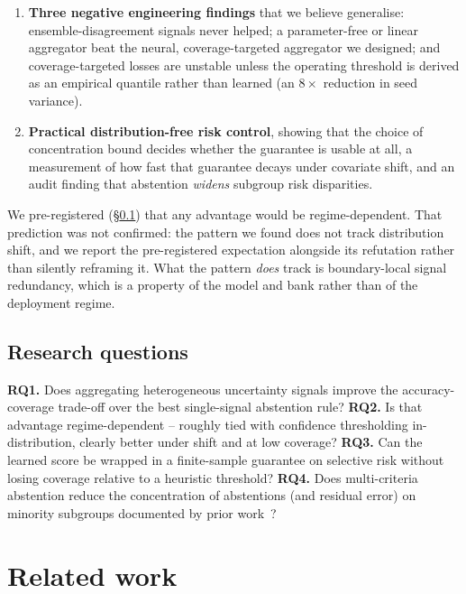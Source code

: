 \documentclass[conference]{IEEEtran}
\begin{document}
\begin{enumerate}
    only one of the three $6\%$ wins we previously reported is
    resolvable (\S\ref{sec:power}).
  \item \textbf{Three negative engineering findings} that we believe
    generalise: ensemble-disagreement signals never helped; a
    parameter-free or linear aggregator beat the neural,
    coverage-targeted aggregator we designed; and coverage-targeted
    losses are unstable unless the operating threshold is derived as an
    empirical quantile rather than learned (an $8\times$ reduction in
    seed variance).
  \item \textbf{Practical distribution-free risk control}, showing that
    the choice of concentration bound decides whether the guarantee is
    usable at all, a measurement of how fast that guarantee decays under
    covariate shift, and an audit finding that abstention \emph{widens}
    subgroup risk disparities.
\end{enumerate}

We pre-registered (\S\ref{sec:rq}) that any advantage would be
regime-dependent. That prediction was not confirmed: the pattern we found
does not track distribution shift, and we report the pre-registered
expectation alongside its refutation rather than silently reframing it.
What the pattern \emph{does} track is boundary-local signal redundancy,
which is a property of the model and bank rather than of the deployment
regime.

\subsection{Research questions}
\label{sec:rq}
\textbf{RQ1.} Does aggregating heterogeneous uncertainty signals improve
the accuracy-coverage trade-off over the best single-signal abstention
rule?
\textbf{RQ2.} Is that advantage regime-dependent -- roughly tied with
confidence thresholding in-distribution, clearly better under shift and at
low coverage?
\textbf{RQ3.} Can the learned score be wrapped in a finite-sample
guarantee on selective risk without losing coverage relative to a
heuristic threshold?
\textbf{RQ4.} Does multi-criteria abstention reduce the concentration of
abstentions (and residual error) on minority subgroups documented by prior
work~\cite{jones2021disparities}?

\section{Related work}
\label{sec:related}
\end{document}
